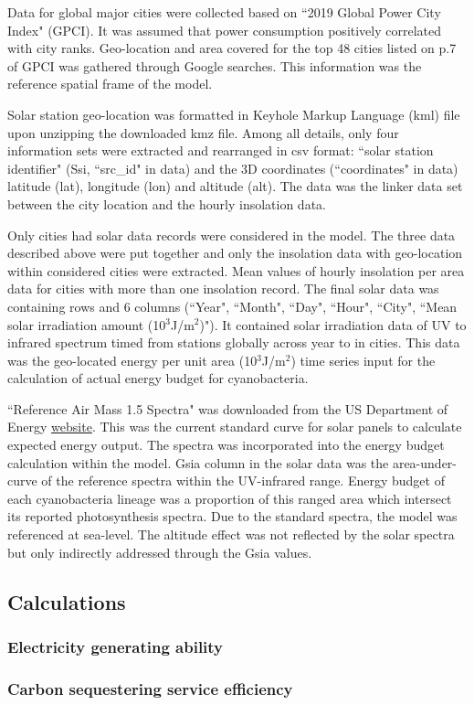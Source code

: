 \documentclass[../thesis.tex]{subfiles} %
\begin{document}
Data for global major cities were collected based on ``2019 Global Power City Index"\autocite{GPCI2019_summary} (GPCI).  It was assumed that power consumption positively correlated with city ranks.  Geo-location and area covered for the top 48 cities listed on p.7 of GPCI was gathered through Google searches.  This information was the reference spatial frame of the model.

Solar station geo-location was formatted in Keyhole Markup Language (kml) file upon unzipping the downloaded kmz file.  Among all details, only four information sets were extracted and rearranged in csv format: ``solar station identifier" (Ssi, ``src\_id" in data) and the 3D coordinates (``coordinates" in data) latitude (lat), longitude (lon) and altitude (alt).  The data was the linker data set between the city location and the hourly insolation data.

Only cities had solar data records were considered in the model.  The three data described above were put together and only the insolation data with geo-location within considered cities were extracted.  Mean values of hourly insolation per area data for cities with more than one insolation record.  The final solar data was containing 
 rows and 6 columns (``Year", ``Month", ``Day", ``Hour", ``City", ``Mean solar irradiation amount (10$^{3}$J/m$^{2}$)").  It contained solar irradiation data of UV to infrared spectrum timed from 
 stations globally across year 
 to 
 in 
 cities.  This data was the geo-located energy per unit area (10$^{3}$J/m$^{2}$) time series input for the calculation of actual energy budget for cyanobacteria.

``Reference Air Mass 1.5 Spectra" was downloaded from the US Department of Energy \href{https://www.nrel.gov/grid/solar-resource/spectra-am1.5.html}{website}.  This was the current standard curve for solar panels to calculate expected energy output.  The spectra was incorporated into the energy budget calculation within the model.  Gsia column in the solar data was the area-under-curve of the reference spectra within the UV-infrared range.  Energy budget of each cyanobacteria lineage was a proportion of this ranged area which intersect its reported photosynthesis spectra.  Due to the standard spectra, the model was referenced at sea-level.  The altitude effect was not reflected by the solar spectra but only indirectly addressed through the Gsia values.

\subsection{Calculations}
\subsubsection{Electricity generating ability}

\subsubsection{Carbon sequestering service efficiency}
\end{document}
